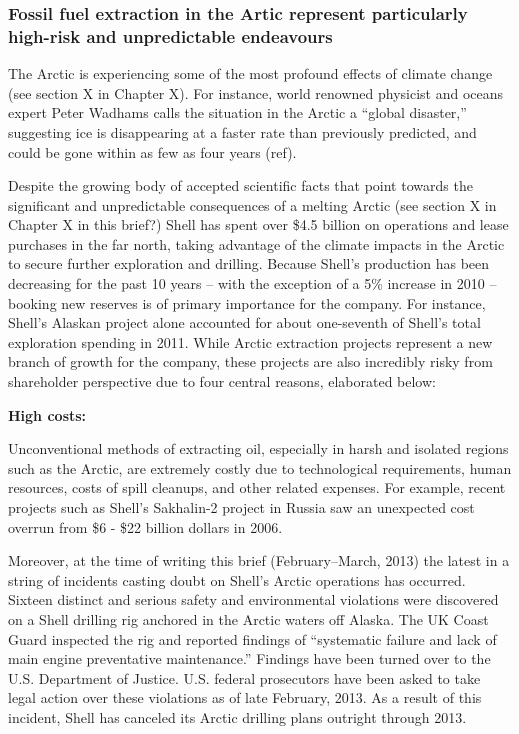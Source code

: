 	\subsubsection{Fossil fuel extraction in the Artic represent particularly high-risk and      
	         unpredictable endeavours}

The Arctic is experiencing some of the most profound effects of climate change (see section X in Chapter X). 
For instance, world renowned physicist and oceans expert Peter Wadhams calls the situation in the Arctic a ``global disaster,'' suggesting ice is disappearing at a faster rate than previously predicted, and could be gone within as few as four years (ref). 


Despite the growing body of accepted scientific facts that point towards the significant and unpredictable consequences of a melting Arctic (see section X in Chapter X in this brief?) Shell has spent over \$4.5 billion on operations and lease purchases in the far north, taking advantage of the climate impacts in the Arctic to secure further exploration and drilling. 
Because Shell’s production has been decreasing for the past 10 years – with the exception of a 5\% increase in 2010 –booking new reserves is of primary importance for the company. 
For instance, Shell's Alaskan project alone accounted for about one-seventh of Shell's total exploration spending in 2011. 
While Arctic extraction projects represent a new branch of growth for the company, these projects are also incredibly risky from shareholder perspective due to four central reasons,  elaborated below:

\textbf{High costs:} 

Unconventional methods of extracting oil, especially in harsh and isolated regions such as the Arctic, are extremely costly due to technological requirements, human resources, costs of spill cleanups, and other related expenses. 
For example, recent projects such as Shell’s Sakhalin-2 project in Russia saw an unexpected cost overrun from \$6 - \$22 billion dollars in 2006. 

Moreover, at the time of writing this brief (February--March, 2013) the latest in a string of incidents casting doubt on Shell’s Arctic operations has occurred. 
Sixteen distinct and serious safety and environmental violations were discovered on a Shell drilling rig anchored in the Arctic waters off Alaska. 
The UK Coast Guard inspected the rig and reported findings of ``systematic failure and lack of main engine preventative maintenance.'' 
Findings have been turned over to the U.S. Department of Justice. U.S. federal prosecutors have been asked to take legal action over these violations as of late February, 2013. 
As a result of this incident, Shell has canceled its Arctic drilling plans outright through 2013.




